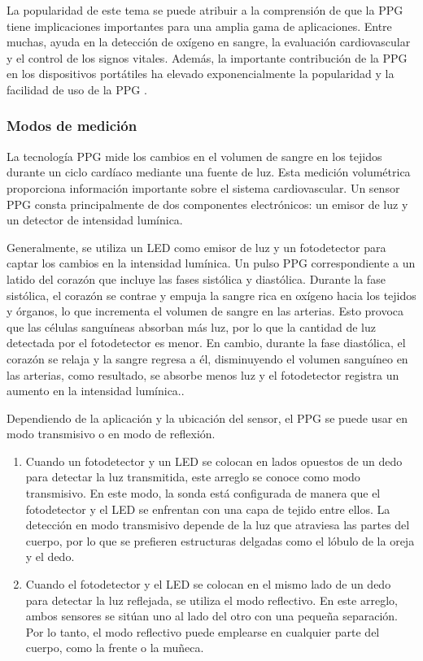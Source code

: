            La popularidad de este tema se puede atribuir a la comprensión de que la PPG tiene implicaciones importantes para una amplia gama de aplicaciones. Entre muchas, ayuda en la detección de oxígeno en sangre, la evaluación cardiovascular y el control de los signos vitales. Además, la importante contribución de la PPG en los dispositivos portátiles ha elevado exponencialmente la popularidad y la facilidad de uso de la PPG \cite{allen_2007}.

        \subsubsection{Modos de medición}
            La tecnología PPG mide los cambios en el volumen de sangre en los tejidos durante un ciclo cardíaco mediante una fuente de luz. Esta medición volumétrica proporciona información importante sobre el sistema cardiovascular. Un sensor PPG consta principalmente de dos componentes electrónicos: un emisor de luz y un detector de intensidad lumínica.

            Generalmente, se utiliza un LED como emisor de luz y un fotodetector para captar los cambios en la intensidad lumínica. Un pulso PPG correspondiente a un latido del corazón que incluye las fases sistólica y diastólica. Durante la fase sistólica, el corazón se contrae y empuja la sangre rica en oxígeno hacia los tejidos y órganos, lo que incrementa el volumen de sangre en las arterias. Esto provoca que las células sanguíneas absorban más luz, por lo que la cantidad de luz detectada por el fotodetector es menor. En cambio, durante la fase diastólica, el corazón se relaja y la sangre regresa a él, disminuyendo el volumen sanguíneo en las arterias, como resultado, se absorbe menos luz y el fotodetector registra un aumento en la intensidad lumínica.\cite{Hiiberia_2023}.

            Dependiendo de la aplicación y la ubicación del sensor, el PPG se puede usar en modo transmisivo o en modo de reflexión.

            \begin{enumerate}
                \item Cuando un fotodetector y un LED se colocan en lados opuestos de un dedo para detectar la luz transmitida, este arreglo se conoce como modo transmisivo. En este modo, la sonda está configurada de manera que el fotodetector y el LED se enfrentan con una capa de tejido entre ellos. La detección en modo transmisivo depende de la luz que atraviesa las partes del cuerpo, por lo que se prefieren estructuras delgadas como el lóbulo de la oreja y el dedo.
                \item Cuando el fotodetector y el LED se colocan en el mismo lado de un dedo para detectar la luz reflejada, se utiliza el modo reflectivo. En este arreglo, ambos sensores se sitúan uno al lado del otro con una pequeña separación. Por lo tanto, el modo reflectivo puede emplearse en cualquier parte del cuerpo, como la frente o la muñeca.
            \end{enumerate}

